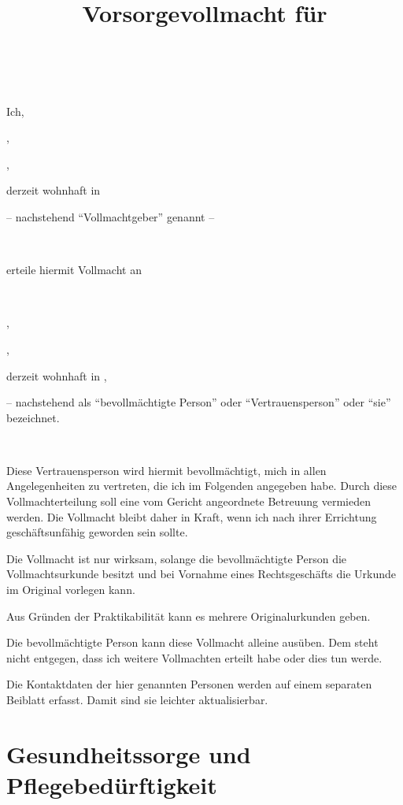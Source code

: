\documentclass[pdftex,12pt,a4paper]{article}
\author{\myfullname}
\title{Vorsorgevollmacht für \\
       \mytrustedone\\
       }
\date{\dateissued}
\begin{document}



% 



\maketitle
\tableofcontents
\setcounter{page}{1}

\newpage




Ich,

\myfullname,

\mydataofbirth,

derzeit wohnhaft in \myaddress

-- nachstehend \enquote{Vollmachtgeber} genannt -- 

~


erteile hiermit Vollmacht an

~
 
\mytrustedone,

\mytrustedonedataofbirth,

derzeit wohnhaft in \mytrustedoneaddress,

-- nachstehend als \enquote{bevollmächtigte Person} oder 
\enquote{Vertrauensperson} oder \enquote{sie} bezeichnet.

~

Diese Vertrauensperson wird hiermit bevollmächtigt, mich in allen Angelegenheiten zu vertreten, die ich
im Folgenden angegeben habe. Durch diese Vollmachterteilung soll eine vom Gericht
angeordnete Betreuung vermieden werden. Die Vollmacht bleibt daher in Kraft, wenn ich nach ihrer
Errichtung geschäftsunfähig geworden sein sollte.

Die Vollmacht ist nur wirksam, solange die bevollmächtigte Person die Vollmachtsurkunde besitzt und
bei Vornahme eines Rechtsgeschäfts die Urkunde im Original vorlegen kann.

Aus Gründen der Praktikabilität kann es mehrere Originalurkunden geben.

Die bevollmächtigte Person kann diese Vollmacht alleine ausüben. Dem steht nicht entgegen, dass ich
weitere Vollmachten erteilt habe oder dies tun werde. 

Die Kontaktdaten der hier genannten Personen werden auf einem separaten Beiblatt erfasst. Damit sind sie leichter aktualisierbar.


\section{Gesundheitssorge und Pflegebedürftigkeit}
\end{document}

